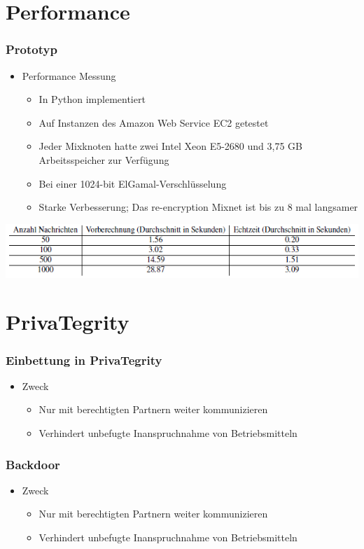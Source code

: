\documentclass[t, xcolor=dvipsnames]{beamer}
\begin{document}
\section{Performance}
\begin{frame}
	\frametitle{Prototyp}
	\begin{itemize}
		\item Performance Messung
			\begin{itemize}
				\item In Python implementiert
				\item Auf Instanzen des Amazon Web Service EC2 getestet
				\item Jeder Mixknoten hatte zwei Intel Xeon E5-2680 und 3,75 GB Arbeitsspeicher zur Verfügung
				\item Bei einer 1024-bit ElGamal-Verschlüsselung
				\item Starke Verbesserung; Das re-encryption Mixnet ist bis zu 8 mal langsamer
			\end{itemize}
			
	\end{itemize}
	\begin{center}
				\includegraphics [width=1\textwidth]{pic/PrototypMessung.png}
			\end{center}
	\vspace{\fill}
\end{frame}

\section{PrivaTegrity}

\begin{frame}
	\frametitle{Einbettung in PrivaTegrity}
	\begin{itemize}
		\item Zweck
			\begin{itemize}
				\item Nur mit \alert{berechtigten Partnern} weiter kommunizieren
				\item Verhindert unbefugte Inanspruchnahme von Betriebsmitteln
			\end{itemize}
	\end{itemize}
	\vspace{\fill}
\end{frame}


\begin{frame}
	\frametitle{Backdoor}
	\begin{itemize}
		\item Zweck
			\begin{itemize}
				\item Nur mit \alert{berechtigten Partnern} weiter kommunizieren
				\item Verhindert unbefugte Inanspruchnahme von Betriebsmitteln
			\end{itemize}
	\end{itemize}
	\vspace{\fill}
\end{frame}
\end{document}
